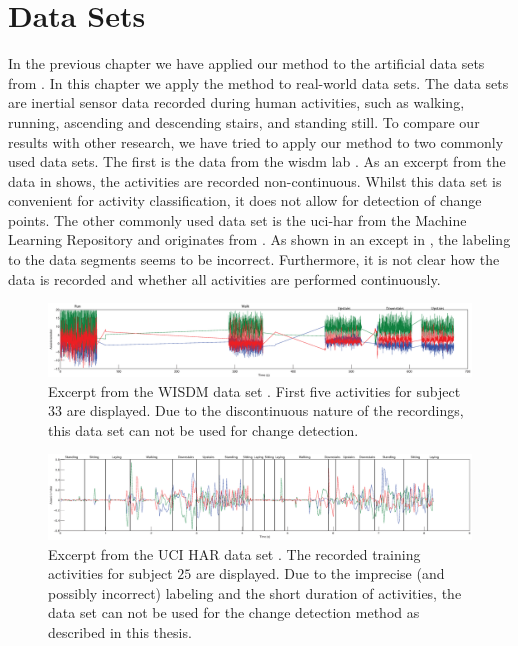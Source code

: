 \section{Data Sets}\label{sec:data_sets}
In the previous chapter we have applied our method to the artificial data sets from \cite{camci2010change,takeuchi2006unifying}.
In this chapter we apply the method to real-world data sets.
The data sets are inertial sensor data recorded during human activities, such as walking, running, ascending and descending stairs, and standing still.
To compare our results with other research, we have tried to apply our method to two commonly used data sets.
The first is the data from the \gls{wisdm} lab \cite{kwapisz2011activity}.
As an excerpt from the data in  shows, the activities are recorded non-continuous.
Whilst this data set is convenient for activity classification, it does not allow for detection of change points.
The other commonly used data set is the \gls{uci-har} from the Machine Learning Repository and originates from \cite{anguita2012human}.
As shown in an except in , the labeling to the data segments seems to be incorrect.
Furthermore, it is not clear how the data is recorded and whether all activities are performed continuously.

\begin{figure}
\centering
  \includegraphics[width=1\textwidth]{./Figures/Chapter6/data_collection/wisdm_excerpt.eps}
  \caption[WISDM Excerpt]{Excerpt from the WISDM data set \cite{kwapisz2011activity}. First five activities for subject $33$ are displayed. Due to the discontinuous nature of the recordings, this data set can not be used for change detection.}
  \label{fig:wisdm_excerpt}
\end{figure}

\begin{figure}
\centering
  \includegraphics[width=1\textwidth]{./Figures/Chapter6/data_collection/uci_annotated.eps}
  \caption[UCI HAR Excerpt]{Excerpt from the UCI HAR data set \cite{anguita2012human}. The recorded training activities for subject $25$ are displayed. Due to the imprecise (and possibly incorrect) labeling and the short duration of activities, the data set can not be used for the change detection method as described in this thesis.}
  \label{fig:uci_annotated}
\end{figure}

